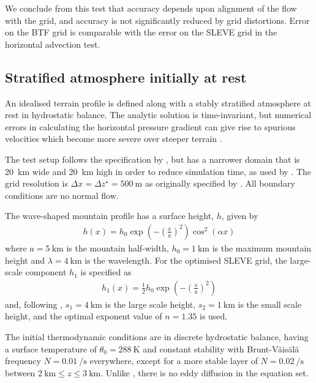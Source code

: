 \documentclass[twocol]{ametsoc}
\begin{document}
We conclude from this test that accuracy depends upon alignment of the flow with the grid, and accuracy is not significantly reduced by grid distortions.  Error on the BTF grid is comparable with the error on the SLEVE grid in the horizontal advection test.

\subsection{Stratified atmosphere initially at rest}
\label{sec:resting}

An idealised terrain profile is defined along with a stably stratified atmosphere at rest in hydrostatic balance.  The analytic solution is time-invariant, but numerical errors in calculating the horizontal pressure gradient can give rise to spurious velocities which become more severe over steeper terrain \citep{klemp2011}.

The test setup follows the specification by \cite{klemp2011}, but has a narrower domain that is \SI{20}{\kilo\meter} wide and \SI{20}{\kilo\meter} high in order to reduce simulation time, as used by \citet{weller-shahrokhi2014}.  The grid resolution is \(\Delta x = \Delta z^\star = \SI{500}{\meter}\) as originally specified by \citet{klemp2011}.  All boundary conditions are no normal flow.

The wave-shaped mountain profile has a surface height, $h$, given by
\begin{align}
	h(x) = h_0 \exp \left( - \left( \frac{x}{a} \right)^2 \right) \cos^2 \left( \alpha x \right) \label{eqn:resting:mountain}
\end{align}
where $a = \SI{5}{\kilo\meter}$ is the mountain half-width, $h_0 = \SI{1}{\kilo\meter}$ is the maximum mountain height and $\lambda = \SI{4}{\kilo\meter}$ is the wavelength.  For the optimised SLEVE grid, the large-scale component $h_1$ is specified as
\begin{align}
h_1(x) = \frac{1}{2} h_0 \exp \left( - \left( \frac{x}{a} \right)^2 \right)
\end{align}
and, following \cite{leuenberger2010}, $s_1 = \SI{4}{\kilo\meter}$ is the large scale height, $s_2 = \SI{1}{\kilo\meter}$ is the small scale height, and the optimal exponent value of $n = 1.35$ is used.

The initial thermodynamic conditions are in discrete hydrostatic balance, having a surface temperature of $\theta_0 = \SI{288}{\kelvin}$ and constant stability with Brunt-V\"ais\"al\"a frequency $N = \SI{0.01}{\per\second}$ everywhere, except for a more stable layer of $N = \SI{0.02}{\per\second}$ between $\SI{2}{\kilo\meter} \leq z \leq \SI{3}{\kilo\meter}$.  Unlike \citet{klemp2011}, there is no eddy diffusion in the equation set.
\end{document}
